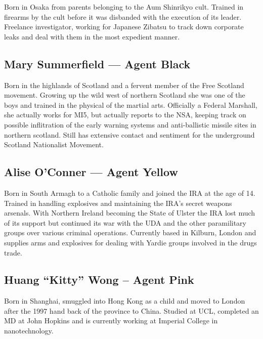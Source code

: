 \documentclass{amsart}
\begin{document}
\begin{multicols}{3}
Born in Osaka from parents belonging to the Aum Shinrikyo cult.
Trained in firearms by the cult before it was disbanded with the
execution of its leader.  Freelance investigator, working for Japanese
Zibatsu to track down corporate leaks and deal with them in the most
expedient manner.


\subsection{Mary Summerfield --- Agent Black}

Born in the highlands of Scotland and a fervent member of the Free
Scotland movement.  Growing up the wild west of northern Scotland she
was one of the boys and trained in the physical of the martial arts.
Officially a Federal Marshall, she actually works for MI5, but
actually reports to the NSA, keeping track on possible inflitration of
the early warning systems and anti-ballistic missile sites in northern
scotland.  Still has extensive contact and sentiment for the
underground Scotland Nationalist Movement.


\subsection{Alise O'Conner --- Agent Yellow}

Born in South Armagh to a Catholic family and joined the IRA at the
age of 14.  Trained in handling explosives and maintaining the IRA's
secret weapons arsenals.  With Northern Ireland becoming the State of
Ulster the IRA lost much of its support but continued its war with the
UDA and the other paramilitary groups over various criminal
operations.  Currently based in Kilburn, London and supplies arms and
explosives for dealing with Yardie groups involved in the drugs trade.


\subsection{Huang ``Kitty'' Wong -- Agent Pink}

Born in Shanghai, smuggled into Hong Kong as a child and moved to
London after the 1997 hand back of the province to China.  Studied at
UCL, completed an MD at John Hopkins and is currently working at
Imperial College in nanotechnology.


\end{multicols}
\end{document}
